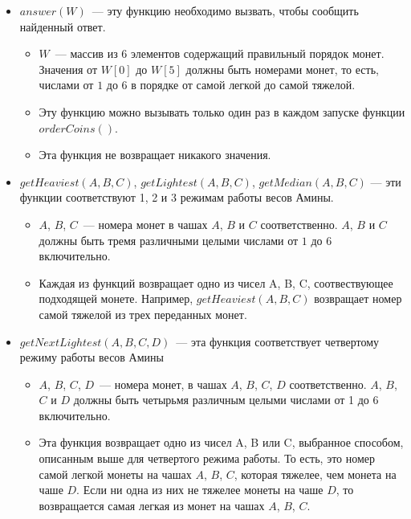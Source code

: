 \begin{itemize}
\item $answer(W)$~--- эту функцию необходимо вызвать, чтобы сообщить найденный ответ.
\begin{itemize}
\item $W$~--- массив из $6$ элементов содержащий правильный порядок монет. Значения от
$W[0]$ до $W[5]$ должны быть номерами монет, то есть, числами от $1$ до $6$ в порядке
от самой легкой до самой тяжелой.
\item Эту функцию можно вызывать только один раз в каждом запуске функции
$orderCoins()$.
\item Эта функция не возвращает никакого значения.
\end{itemize}
\item $getHeaviest(A, B, C)$, $getLightest(A, B, C)$, $getMedian(A, B, C)$ --- эти
функции соответствуют 1, 2 и 3 режимам работы весов Амины.
\begin{itemize}
\item $A$, $B$, $C$~--- номера монет в чашах $A$, $B$ и $C$ соответственно. $A$, $B$ и $C$ должны быть
тремя различными целыми числами от $1$ до $6$ включительно.
\item Каждая из функций возвращает одно из чисел A, B, C, соотвествующее подходящей
монете. Например, $getHeaviest(A, B, C)$ возвращает номер самой тяжелой из
трех переданных монет.
\end{itemize}
\item $getNextLightest(A, B, C, D)$~--- эта функция соответствует четвертому режиму
работы весов Амины
\begin {itemize}
\item $A$, $B$, $C$, $D$~--- номера монет, в чашах $A$, $B$, $C$, $D$ соответственно. $A$, $B$, $C$ и $D$ должны
быть четырьмя различным целыми числами от 1 до 6 включительно.
\item Эта функция возвращает одно из чисел A, B или C, выбранное способом, описанным
выше для четвертого режима работы. То есть, это номер самой легкой монеты на
чашах $A$, $B$, $C$, которая тяжелее, чем монета на чаше $D$. Если ни одна из них не
тяжелее монеты на чаше $D$, то возвращается самая легкая из монет на чашах $A$,
$B$, $C$.
\end{itemize}
\end{itemize}